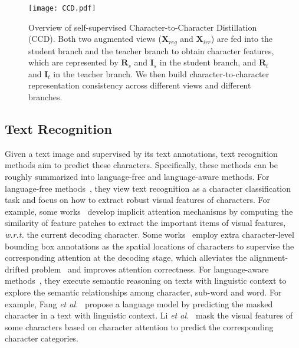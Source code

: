 \documentclass[10pt,twocolumn,letterpaper]{article}
\begin{document}
\begin{figure*}[t]
  \centering
  \graphicspath{{./graph/}}
  \texttt{[image: CCD.pdf]}
  \caption{Overview of self-supervised Character-to-Character Distillation (CCD). Both two augmented views ($\mathbf{X}_{reg}$ and $\mathbf{X}_{irr}$) are fed into the student branch and the teacher branch to obtain character features, which are represented by $\mathbf{R}_{s}$ and $\mathbf{I}_{s}$ in the student branch, and $\mathbf{R}_{t}$ and $\mathbf{I}_{t}$ in the teacher branch. We then build character-to-character representation consistency across different views and different branches.
  }
  \label{Figs.Network}
  \vspace{-1.3em}
\end{figure*}
\subsection{Text Recognition}
Given a text image and supervised by its text annotations, text recognition methods aim to predict these characters. Specifically, these methods can be roughly summarized into language-free and language-aware methods. For language-free methods~\cite{CRNN:shi2016end,PIMNet,SAR:li2019show,SATRN:lee2020recognizing,zhong2022sgbanet,wan2020textscanner,liao2019scene,Masktextspotter,Bhunia_2021_ICCV, bhunia2021metahtr,xie2022understanding}, they view text recognition as a character classification task and focus on how to extract robust visual features of characters. For example, some works~\cite{CRNN:shi2016end,PIMNet,SAR:li2019show,SATRN:lee2020recognizing,SCATTER:litman2020scatter,zhong2022sgbanet,ScRN:yang2019symmetry} develop implicit attention mechanisms by computing the similarity of feature patches to extract the important items of visual features, \emph{w.r.t.} the current decoding character. Some works~\cite{wan2020textscanner,liao2019scene,Masktextspotter} employ extra character-level bounding box annotations as the spatial locations of characters to supervise the corresponding attention at the decoding stage, which alleviates the alignment-drifted problem~\cite{robustscanner} and improves attention correctness. For language-aware methods~\cite{ABINET:fang2021read,bhunia2021joint,visionLAN,SRN:yu2020towards}, they execute semantic reasoning on texts with linguistic context to explore the semantic relationships among character, sub-word and word. For example, Fang \emph{et al.}~\cite{ABINET:fang2021read} propose a language model by predicting the masked character in a text with linguistic context. 
Li \emph{et al.}~\cite{visionLAN} mask the visual features of some characters based on character attention to predict the corresponding character categories. 
\end{document}

